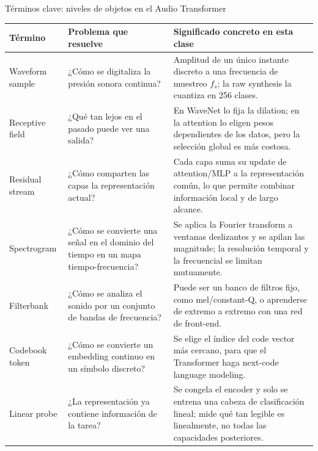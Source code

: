 \begin{knowledgebox}{Términos clave: niveles de objetos en el Audio Transformer}
\small
\begin{tabularx}{\textwidth}{L{0.20\textwidth}L{0.27\textwidth}X}
\toprule
Término & Problema que resuelve & Significado concreto en esta clase \\
\midrule
Waveform sample & ¿Cómo se digitaliza la presión sonora continua? & Amplitud de un único instante discreto a una frecuencia de muestreo $f_s$; la raw synthesis la cuantiza en 256 clases. \\
Receptive field & ¿Qué tan lejos en el pasado puede ver una salida? & En WaveNet lo fija la dilation; en la attention lo eligen pesos dependientes de los datos, pero la selección global es más costosa. \\
Residual stream & ¿Cómo comparten las capas la representación actual? & Cada capa suma su update de attention/MLP a la representación común, lo que permite combinar información local y de largo alcance. \\
Spectrogram & ¿Cómo se convierte una señal en el dominio del tiempo en un mapa tiempo-frecuencia? & Se aplica la Fourier transform a ventanas deslizantes y se apilan las magnitude; la resolución temporal y la frecuencial se limitan mutuamente. \\
Filterbank & ¿Cómo se analiza el sonido por un conjunto de bandas de frecuencia? & Puede ser un banco de filtros fijo, como mel/constant-Q, o aprenderse de extremo a extremo con una red de front-end. \\
Codebook token & ¿Cómo se convierte un embedding continuo en un símbolo discreto? & Se elige el índice del code vector más cercano, para que el Transformer haga next-code language modeling. \\
Linear probe & ¿La representación ya contiene información de la tarea? & Se congela el encoder y solo se entrena una cabeza de clasificación lineal; mide qué tan legible es linealmente, no todas las capacidades posteriores. \\
\bottomrule
\end{tabularx}
\end{knowledgebox}


